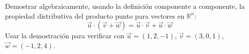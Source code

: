 Demostrar algebraicamente, usando la definición componente a componente, la propiedad distributiva del producto punto para vectores en $\mathbb{R}^n$:
\[ \vec{u} \cdot (\vec{v} + \vec{w}) = \vec{u} \cdot \vec{v} + \vec{u} \cdot \vec{w} \]
Usar la demostración para verificar con $\vec{u} = (1,2,-1)$, $\vec{v} = (3,0,1)$, $\vec{w} = (-1,2,4)$.